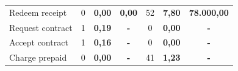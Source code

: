 \documentclass[conference]{IEEEtran}
\begin{document}
\begin{table}[!htbp]
\begin{tabular}{lcrccrc}
Redeem receipt                           & 0                                                                                        & \textbf{0,00}                                                                                                     & \multicolumn{1}{r}{\textbf{0,00}}                                                                  & 52                                                                                          & \textbf{7,80}                                                                                                     & \multicolumn{1}{r}{\textbf{78.000,00}}                                                            \\
Request contract                         & 1                                                                                        & \textbf{0,19}                                                                                                     & \textbf{-}                                                                                         & 0                                                                                           & \textbf{0,00}                                                                                                     & \textbf{-}                                                                                        \\
Accept contract                          & 1                                                                                        & \textbf{0,16}                                                                                                     & \textbf{-}                                                                                         & 0                                                                                           & \textbf{0,00}                                                                                                     & \textbf{-}                                                                                        \\
Charge prepaid                           & 0                                                                                        & \textbf{0,00}                                                                                                     & \textbf{-}                                                                                         & 41                                                                                          & \textbf{1,23}                                                                                                     & \textbf{-}                                                                                       
\end{tabular}
\end{table}
\end{document}
